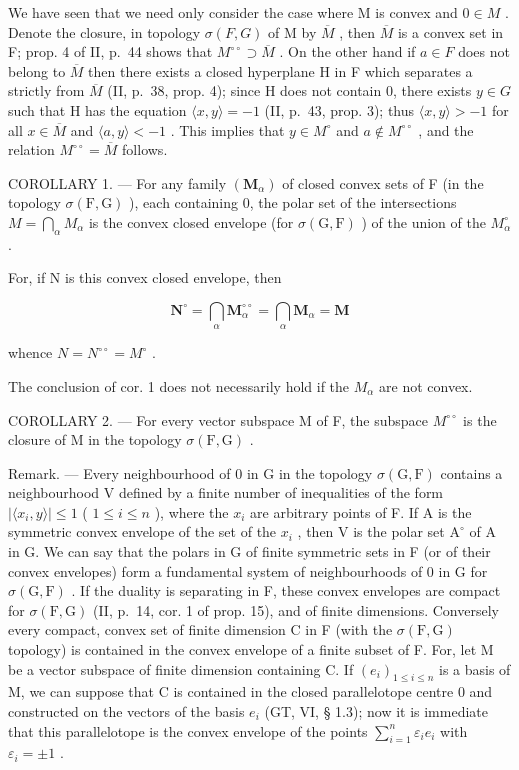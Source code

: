 We have seen that we need only consider the case where M is convex and \(0 \in M\) . Denote the closure, in topology \(\sigma(F, G)\) of M by \(\overline{M}\) , then \(\overline{M}\) is a convex set in F; prop. 4 of II, p.~44 shows that \(M^{\circ\circ} \supset \overline{M}\) . On the other hand if \(a \in F\) does not belong to \(\overline{M}\) then there exists a closed hyperplane H in F which separates a strictly from \(\overline{M}\) (II, p.~38, prop. 4); since H does not contain 0, there exists \(y \in G\) such that H has the equation \(\langle x, y \rangle = -1\) (II, p.~43, prop. 3); thus \(\langle x, y \rangle > -1\) for all \(x \in \overline{M}\) and \(\langle a, y \rangle < -1\) . This implies that \(y \in M^{\circ}\) and \(a \notin M^{\circ\circ}\) , and the relation \(M^{\circ\circ} = \overline{M}\) follows.

COROLLARY 1. --- For any family \((\mathbf{M}_{\alpha})\) of closed convex sets of F (in the topology \(\sigma(\mathrm{F}, \mathrm{G})\) ), each containing 0, the polar set of the intersections \(M = \bigcap_{\alpha} M_{\alpha}\) is the convex closed envelope (for \(\sigma(\mathrm{G}, \mathrm{F})\) ) of the union of the \(M_{\alpha}^{\circ}\) .

For, if N is this convex closed envelope, then

\[
\mathbf {N} ^ {\circ} = \bigcap_ {\alpha} \mathbf {M} _ {\alpha} ^ {\circ \circ} = \bigcap_ {\alpha} \mathbf {M} _ {\alpha} = \mathbf {M}
\]

whence \(N = N^{\circ\circ} = M^{\circ}\) .

The conclusion of cor. 1 does not necessarily hold if the \(M_{\alpha}\) are not convex.

COROLLARY 2. --- For every vector subspace M of F, the subspace \(M^{\circ\circ}\) is the closure of M in the topology \(\sigma(\mathrm{F}, \mathrm{G})\) .

Remark. --- Every neighbourhood of 0 in G in the topology \(\sigma(\mathrm{G},\mathrm{F})\) contains a neighbourhood V defined by a finite number of inequalities of the form \(|\langle x_i,y\rangle |\leqslant 1\) ( \(1\leqslant i\leqslant n\) ), where the \(x_{i}\) are arbitrary points of F. If A is the symmetric convex envelope of the set of the \(x_{i}\) , then V is the polar set \(\mathrm{A}^{\circ}\) of A in G. We can say that the polars in G of finite symmetric sets in F (or of their convex envelopes) form a fundamental system of neighbourhoods of 0 in G for \(\sigma(\mathrm{G},\mathrm{F})\) . If the duality is separating in F, these convex envelopes are compact for \(\sigma(\mathrm{F},\mathrm{G})\) (II, p.~14, cor. 1 of prop. 15), and of finite dimensions. Conversely every compact, convex set of finite dimension C in F (with the \(\sigma(\mathrm{F},\mathrm{G})\) topology) is contained in the convex envelope of a finite subset of F. For, let M be a vector subspace of finite dimension containing C. If \((e_i)_{1\leqslant i\leqslant n}\) is a basis of M, we can suppose that C is contained in the closed parallelotope centre 0 and constructed on the vectors of the basis \(e_i\) (GT, VI, § 1.3); now it is immediate that this parallelotope is the convex envelope of the points \(\sum_{i=1}^{n} \varepsilon_i e_i\) with \(\varepsilon_i = \pm 1\) .

